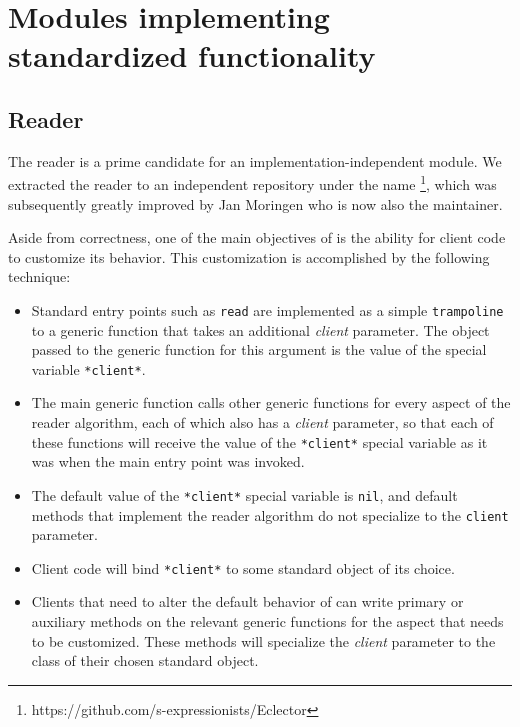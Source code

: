 \chapter{Modules implementing standardized functionality}

\section{Reader}
\label{sec-reader}

The \commonlisp{} reader is a prime candidate for an
implementation-independent module.  We extracted the \sysname{} reader
to an independent repository under the name \eclector{}%
\footnote{https://github.com/s-expressionists/Eclector}, which was
subsequently greatly improved by Jan Moringen who is now also the
maintainer.

Aside from correctness, one of the main objectives of \eclector{} is
the ability for client code to customize its behavior.  This
customization is accomplished by the following technique:

\begin{itemize}
\item Standard entry points such as \texttt{read} are implemented as a
  simple \texttt{trampoline} to a generic function that takes an
  additional \emph{client} parameter.  The object passed to the
  generic function for this argument is the value of the special
  variable \texttt{*client*}.
\item The main generic function calls other generic functions for
  every aspect of the reader algorithm, each of which also has a
  \emph{client} parameter, so that each of these functions will
  receive the value of the \texttt{*client*} special variable as it
  was when the main entry point was invoked.
\item The default value of the \texttt{*client*} special variable is
  \texttt{nil}, and default methods that implement the reader
  algorithm do not specialize to the \texttt{client} parameter.
\item Client code will bind \texttt{*client*} to some standard object
  of its choice.
\item Clients that need to alter the default behavior of \eclector{}
  can write primary or auxiliary methods on the relevant generic
  functions for the aspect that needs to be customized.  These methods
  will specialize the \emph{client} parameter to the class of their
  chosen standard object.
\end{itemize}

